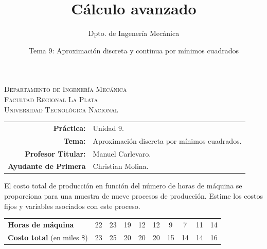\documentclass[11pt]{article}
\title{Cálculo avanzado}
\author{Dpto. de Ingenería Mecánica}
\date{Tema 9: Aproximación discreta y continua por mínimos cuadrados}
\begin{document}

\begin{center}
\end{center}

\begin{center}
	\vspace{\baselineskip}
	\Large{\textsc{Departamento de Ingenería Mecánica}} \\
	\textsc{Facultad Regional La Plata} \\
	\textsc{Universidad Tecnológica Nacional}
\end{center}


\begin{center}
	\begin{tabular}{r l}
		\textbf{Práctica:}           & Unidad 9.                                    \\
		\textbf{Tema:}               & Aproximación discreta por mínimos cuadrados. \\
		\textbf{Profesor Titular:}   & Manuel Carlevaro.                            \\
		\textbf{Ayudante de Primera} & Christian Molina.                            \\
	\end{tabular}\end{center}
\vspace{1em}

\begin{question} %
	El costo total de producción en función del número de horas de máquina se proporciona para una muestra de nueve procesos de producción. Estime los costos fijos y variables asociados con este proceso.

	\begin{center}
		\begin{tabular}{lccccccccc}
			\toprule
			\textbf{Horas de máquina}          & 22 & 23 & 19 & 12 & 12 & 9  & 7  & 11 & 14 \\
			\textbf{Costo total} (en miles \$) & 23 & 25 & 20 & 20 & 20 & 15 & 14 & 14 & 16 \\
			\bottomrule
		\end{tabular}
	\end{center}
\end{question}
\end{document}

